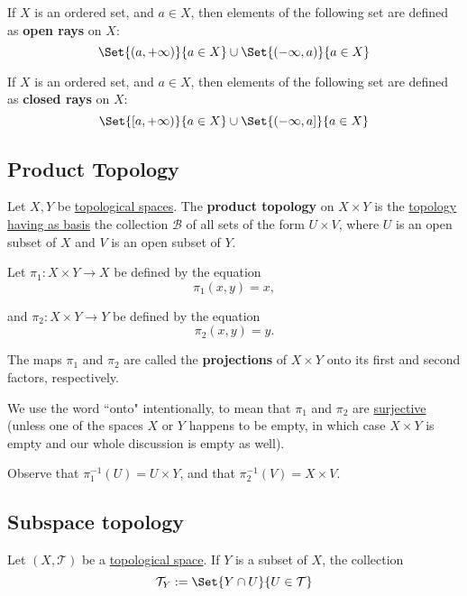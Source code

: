 If $X$ is an ordered set, and $a\in X$, then elements of the following set are
defined as \textbf{open rays} on $X$:
$$
  \Set{(a,+\infty)}{a\in X}\cup
  \Set{(-\infty,a)}{a\in X}
$$

\label{a52dbf3}

If $X$ is an ordered set, and $a\in X$, then elements of the following set are
defined as \textbf{closed rays} on $X$:
$$
  \Set{[a,+\infty)}{a\in X}\cup
  \Set{(-\infty,a]}{a\in X}
$$

\subsection{Product Topology}\label{e0a3ba0}

\label{be6372e}

Let $X,Y$ be \href{de3c1b1}{topological spaces}. The \textbf{product topology}
on $X\times Y$ is the \href{e6b5306}{topology having as basis} the collection
$\mathcal B$ of all sets of the form $U\times V$, where $U$ is an open subset
of $X$ and $V$ is an open subset of $Y$.

\label{cad7d68}

Let $\pi_1:X\times Y\to X$ be defined by the equation
$$
  \pi_1(x,y)=x,
$$

and $\pi_2:X\times Y\to Y$ be defined by the equation
$$
  \pi_2(x,y)=y.
$$

The maps $\pi_1$ and $\pi_2$ are called the \textbf{projections} of $X\times Y$
onto its first and second factors, respectively.

We use the word ``onto" intentionally, to mean that $\pi_1$ and $\pi_2$ are
\href{bd75843}{surjective} (unless one of the spaces $X$ or $Y$ happens to be
empty, in which case $X\times Y$ is empty and our whole discussion is empty as
well).

Observe that $\pi_1^{-1}(U)=U\times Y$, and that $\pi_2^{-1}(V)=X\times V$.

\subsection{Subspace topology}\label{a8be694}

\label{cddfbd8}

Let $(X,\mathcal T)$ be a \href{de3c1b1}{topological space}. If $Y$ is a subset
of $X$, the collection
$$
  \mathcal T_Y:=\Set{Y\cap U}{U\in\mathcal T}
$$

